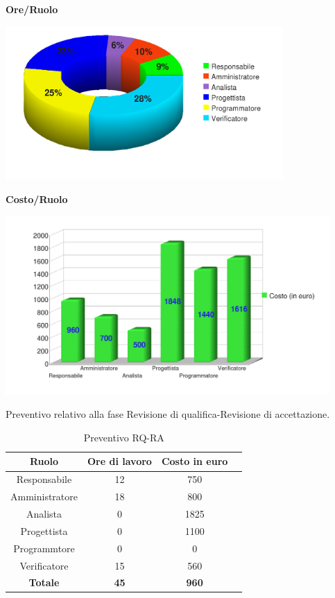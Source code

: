 \begin{center}\textbf{Ore/Ruolo}
\end{center}
\includegraphics[width=300pt]{RPP-RQ_Ore}
\newpage
\begin{center}\textbf{Costo/Ruolo}
\end{center}
\includegraphics[width=350pt]{RPP-RQ_Costi}

Preventivo relativo alla fase Revisione di qualifica-Revisione di accettazione.
\begin{table}[h]
	\begin{center}
		  \begin{tabular}{|c|c|c|c|}
		 \hline 
		 \textbf{Ruolo} & \textbf{Ore di lavoro} & \textbf{Costo in euro}\\
		 \hline
		Responsabile & 12 & 750 \\
		Amministratore & 18 & 800\\
		Analista & 0 & 1825\\
		Progettista & 0 & 1100\\
		Programmtore & 0 & 0 \\
		Verificatore & 15 & 560\\
        \hline
        \textbf{Totale} & \textbf{45} & \textbf{960}\\
		\hline
		\end{tabular}
	\caption{Preventivo RQ-RA} 
	\label{tab:tabella_RQ-RA}
	\end{center}	
\end{table}


